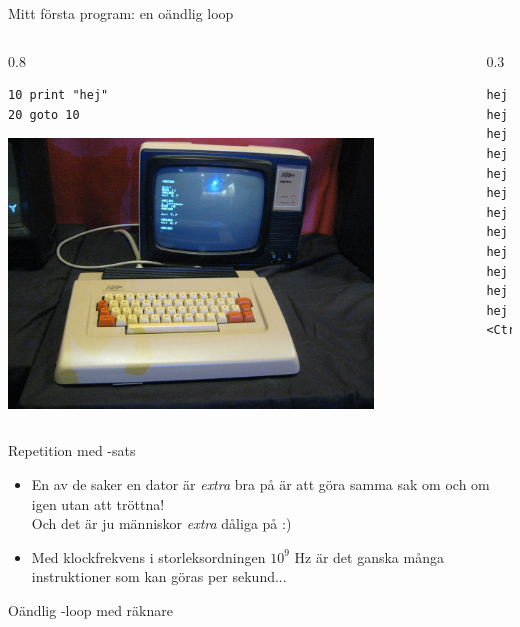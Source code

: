 \documentclass{lecturenotes}
\begin{document}
\begin{Slide}{Mitt första program: en oändlig loop}
\begin{columns}
\begin{column}{0.8\textwidth}
\begin{verbatim}
10 print "hej"
20 goto 10
\end{verbatim}
\includegraphics[width=0.8\textwidth]{img/abc80.jpg}
\end{column}
\begin{column}{0.3\textwidth}
\pause
\begin{verbatim}
hej
hej
hej
hej
hej
hej
hej
hej
hej
hej
hej
hej
<Ctrl+C>
\end{verbatim}

\end{column}
\end{columns}
\end{Slide}

\begin{Slide}{Repetition med -sats}

\pause
\begin{itemize}
\item En av de saker en dator är \textit{extra} bra på är att göra samma sak om och om igen utan att tröttna! \\
Och det är ju människor \textit{extra} dåliga på :)
\item Med klockfrekvens i storleksordningen $10^9$ Hz är det ganska många instruktioner som kan göras per sekund...
\end{itemize}
\end{Slide}

\begin{Slide}{Oändlig -loop med räknare}

\end{Slide}
\end{document}
